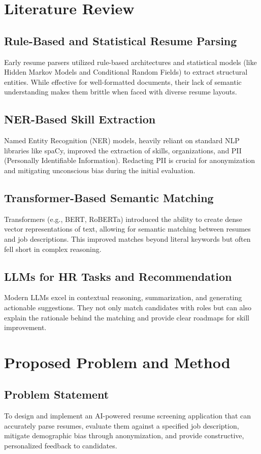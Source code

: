 \documentclass[12pt,a4paper]{article}
\begin{document}
\section{Literature Review}

\subsection{Rule-Based and Statistical Resume Parsing}
Early resume parsers utilized rule-based architectures and statistical models (like Hidden Markov Models and Conditional Random Fields) to extract structural entities. While effective for well-formatted documents, their lack of semantic understanding makes them brittle when faced with diverse resume layouts.

\subsection{NER-Based Skill Extraction}
Named Entity Recognition (NER) models, heavily reliant on standard NLP libraries like spaCy, improved the extraction of skills, organizations, and PII (Personally Identifiable Information). Redacting PII is crucial for anonymization and mitigating unconscious bias during the initial evaluation.

\subsection{Transformer-Based Semantic Matching}
Transformers (e.g., BERT, RoBERTa) introduced the ability to create dense vector representations of text, allowing for semantic matching between resumes and job descriptions. This improved matches beyond literal keywords but often fell short in complex reasoning.

\subsection{LLMs for HR Tasks and Recommendation}
Modern LLMs excel in contextual reasoning, summarization, and generating actionable suggestions. They not only match candidates with roles but can also explain the rationale behind the matching and provide clear roadmaps for skill improvement.

\section{Proposed Problem and Method}

\subsection{Problem Statement}
To design and implement an AI-powered resume screening application that can accurately parse resumes, evaluate them against a specified job description, mitigate demographic bias through anonymization, and provide constructive, personalized feedback to candidates.
\end{document}
